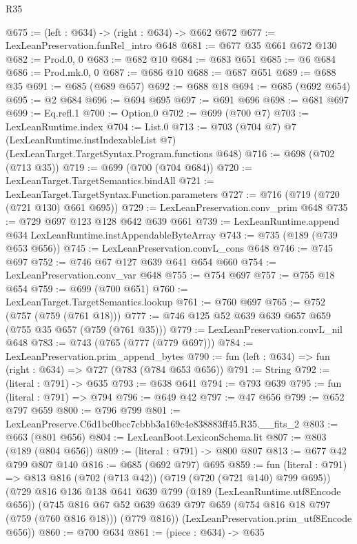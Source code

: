 \begin{lexlean}{R35}
\begin{coremodule}
@675 := (left : @634) -> (right : @634) -> @662 @672
@677 := LexLeanPreservation.funRel_intro @648
@681 := @677 @35 @661 @672 @130
@682 := Prod.{0, 0}
@683 := @682 @10
@684 := @683 @651
@685 := @6 @684
@686 := Prod.mk.{0, 0}
@687 := @686 @10
@688 := @687 @651
@689 := @688 @35
@691 := @685 (@689 @657)
@692 := @688 @18
@694 := @685 (@692 @654)
@695 := @2 @684
@696 := @694 @695
@697 := @691 @696
@698 := @681 @697
@699 := Eq.refl.{1}
@700 := Option.{0}
@702 := @699 (@700 @7)
@703 := LexLeanRuntime.index
@704 := List.{0}
@713 := @703
    (@704 @7)
    @7
    (LexLeanRuntime.instIndexableList @7)
    (LexLeanTarget.TargetSyntax.Program.functions @648)
@716 := @698 (@702 (@713 @35))
@719 := @699 (@700 (@704 @684))
@720 := LexLeanTarget.TargetSemantics.bindAll
@721 := LexLeanTarget.TargetSyntax.Function.parameters
@727 := @716 (@719 (@720 (@721 @130) @661 @695))
@729 := LexLeanPreservation.conv_prim @648
@735 := @729 @697 @123 @128 @642 @639 @661
@739 := LexLeanRuntime.append @634 LexLeanRuntime.instAppendableByteArray
@743 := @735 (@189 (@739 @653 @656))
@745 := LexLeanPreservation.convL_cons @648
@746 := @745 @697
@752 := @746 @67 @127 @639 @641 @654 @660
@754 := LexLeanPreservation.conv_var @648
@755 := @754 @697
@757 := @755 @18 @654
@759 := @699 (@700 @651)
@760 := LexLeanTarget.TargetSemantics.lookup
@761 := @760 @697
@765 := @752 (@757 (@759 (@761 @18)))
@777 := @746 @125 @52 @639 @639 @657 @659 (@755 @35 @657 (@759 (@761 @35)))
@779 := LexLeanPreservation.convL_nil @648
@783 := @743 (@765 (@777 (@779 @697)))
@784 := LexLeanPreservation.prim_append_bytes
@790 := fun (left : @634) => fun (right : @634) => @727 (@783 (@784 @653 @656))
@791 := String
@792 := (literal : @791) -> @635
@793 := @638 @641
@794 := @793 @639
@795 := fun (literal : @791) => @794
@796 := @649 @42
@797 := @47 @656
@799 := @652 @797 @659
@800 := @796 @799
@801 := LexLeanPreserve.C6d1bc0bcc7cbbb3a169c4e838883ff45.R35.__fits_2
@803 := @663 (@801 @656)
@804 := LexLeanBoot.LexiconSchema.lit
@807 := @803 (@189 (@804 @656))
@809 := (literal : @791) -> @800 @807
@813 := @677 @42 @799 @807 @140
@816 := @685 (@692 @797) @695
@859 := fun (literal : @791) =>
  @813
    @816
    (@702 (@713 @42))
    (@719 (@720 (@721 @140) @799 @695))
    (@729
      @816
      @136
      @138
      @641
      @639
      @799
      (@189 (LexLeanRuntime.utf8Encode @656))
      (@745
        @816
        @67
        @52
        @639
        @639
        @797
        @659
        (@754 @816 @18 @797 (@759 (@760 @816 @18)))
        (@779 @816))
      (LexLeanPreservation.prim_utf8Encode @656))
@860 := @700 @634
@861 := (piece : @634) -> @635

\end{coremodule}
\end{lexlean}
